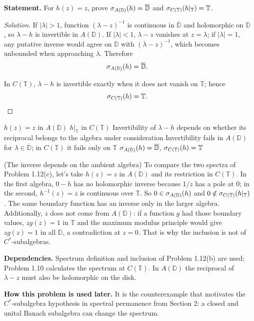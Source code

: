 \noindent\textbf{Statement.} For $h(z)=z$, prove $\sigma_{A(\mathbb D)}(h)=\overline{\mathbb D}$ and $\sigma_{C(\mathbb T)}(h|_{\mathbb T})=\mathbb T$.

\begin{proof}[Solution]
If $|\lambda|>1$, function $(\lambda-z)^{-1}$ is continuous in $\overline{\mathbb D}$ and holomorphic
on $\mathbb D$, so $\lambda-h$ is invertible in $A(\mathbb D)$. If $|\lambda|<1$,
$\lambda-z$ vanishes at $z=\lambda$; if $|\lambda|=1$, any putative inverse would agree on
$\mathbb D$ with $(\lambda-z)^{-1}$, which becomes unbounded when approaching $\lambda$. Therefore
\[
 \sigma_{A(\mathbb D)}(h)=\overline{\mathbb D}.
\]

In $C(\mathbb T)$, $\lambda-h$ is invertible exactly when it does not vanish on $\mathbb T$; hence
\[
 \sigma_{C(\mathbb T)}(h)=\mathbb T.
\]
\end{proof}

\proofdiagrambranch
{$h(z)=z$ in $A(\mathbb D)$}
{$h|_{\mathbb T}$ in $C(\mathbb T)$}
{Invertibility of $\lambda-h$ depends on whether its reciprocal belongs to the algebra under consideration}
{Invertibility fails in $A(\mathbb D)$ for $\lambda\in\overline{\mathbb D}$; in $C(\mathbb T)$ it fails only on $\mathbb T$}
{$\sigma_{A(\mathbb D)}(h)=\overline{\mathbb D}$, $\sigma_{C(\mathbb T)}(h)=\mathbb T$}

\begin{cthejemplo}{(The inverse depends on the ambient algebra)}
To compare the two spectra of Problem 1.12(c), let's take $h(z)=z$ in $A(\mathbb D)$ and
its restriction in $C(\mathbb T)$.
In the first algebra, $0-h$ has no holomorphic inverse because $1/z$ has a pole at
$0$; in the second, $h^{-1}(z)=\overline z$ is continuous over $\mathbb T$.
So $0\in\sigma_{A(\mathbb D)}(h)$ and $0\notin\sigma_{C(\mathbb T)}(h|_{\mathbb T})$.
The same boundary function has an inverse only in the larger algebra. Additionally,
$\overline z$ does not come from $A(\mathbb D)$: if a function $g$ had those boundary values, $zg(z)=1$ in $\mathbb T$ and the maximum modulus principle would give $zg(z)=1$ in all
$\mathbb D$, a contradiction at $z=0$. That is why the inclusion is not of $C^*$-subalgebras.
\end{cthejemplo}

\noindent\textbf{Dependencies.} Spectrum definition and inclusion of Problem 1.12(b) are used; Problem 1.10 calculates the spectrum at $C(\mathbb T)$. In $A(\mathbb D)$ the reciprocal of $\lambda-z$ must also be holomorphic on the disk.

\noindent\textbf{How this problem is used later.} It is the counterexample that motivates the $C^*$-subalgebra hypothesis in spectral permanence from Section 2: a closed and unital Banach subalgebra can change the spectrum.
